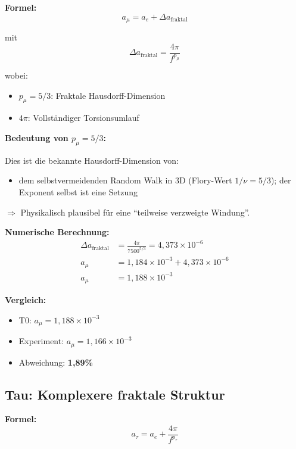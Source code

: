 	\textbf{Formel:}
	\begin{equation}
		a_\mu = a_e + \Delta a_{\text{fraktal}}
		\label{eq:amu}
	\end{equation}
	
	mit
	\begin{equation}
		\Delta a_{\text{fraktal}} = \frac{4\pi}{f^{p_\mu}}
		\label{eq:delta_mu}
	\end{equation}
	
	wobei:
	\begin{itemize}
		\item $p_\mu = 5/3$: Fraktale Hausdorff-Dimension
		\item $4\pi$: Vollständiger Torsionsumlauf
	\end{itemize}
	
	\textbf{Bedeutung von $p_\mu = 5/3$:}
	
	Dies ist die bekannte Hausdorff-Dimension von:
	\begin{itemize}
		\item dem selbstvermeidenden Random Walk in 3D (Flory-Wert $1/\nu = 5/3$); der Exponent selbst ist eine Setzung
	\end{itemize}
	
	$\Rightarrow$ Physikalisch plausibel für eine ``teilweise verzweigte Windung''.
	
	\textbf{Numerische Berechnung:}
	\begin{align}
		\Delta a_{\text{fraktal}} &= \frac{4\pi}{7500^{5/3}} = 4{,}373 \times 10^{-6} \\
		a_\mu &= 1{,}184 \times 10^{-3} + 4{,}373 \times 10^{-6} \\
		a_\mu &= 1{,}188 \times 10^{-3}
	\end{align}
	
	\textbf{Vergleich:}
	\begin{itemize}
		\item T0: $a_\mu = 1{,}188 \times 10^{-3}$
		\item Experiment: $a_\mu = 1{,}166 \times 10^{-3}$
		\item Abweichung: \textbf{1{,}89\%}
	\end{itemize}
	
	\subsection{Tau: Komplexere fraktale Struktur}
	
	\textbf{Formel:}
	\begin{equation}
		a_\tau = a_e + \frac{4\pi}{f^{p_\tau}}
		\label{eq:atau}
	\end{equation}
	

